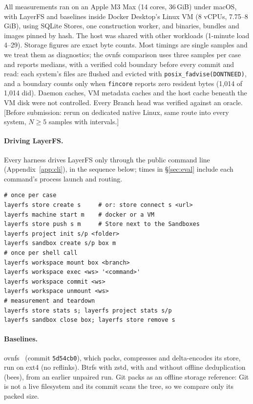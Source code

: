 \documentclass[letterpaper,twocolumn,10pt]{article}
\newif\ifdraft\drafttrue
\newcommand{\dnote}[1]{\ifdraft\textcolor{red!70!black}{\textsf{\small[#1]}}\fi}
\newcommand{\sys}{LayerFS}
\begin{document}
All measurements ran on an Apple M3 Max (14 cores, 36\,GiB) under macOS,
with \sys{} and baselines inside Docker Desktop's Linux VM (8 vCPUs,
7.75--8\,GiB), using SQLite Stores, one construction worker, and binaries,
bundles and images pinned by hash. The host was shared with other workloads
(1-minute load 4--29). Storage figures are exact byte counts. Most timings
are single samples and we treat them as diagnostics; the ovnfs comparison
uses three samples per case and reports medians, with a verified cold
boundary before every commit and read: each system's files are flushed and
evicted with \texttt{posix\_fadvise(DONTNEED)}, and a boundary counts only
when \texttt{fincore} reports zero resident bytes (1,014 of 1,014 did).
Daemon caches, VM metadata caches and the host cache beneath the VM disk
were not controlled. Every Branch head was verified against an oracle.
\dnote{Before submission: rerun on dedicated native Linux, same route into
every system, $N\geq5$ samples with intervals.}

\paragraph{Driving \sys{}.} Every harness drives \sys{} only through the
public command line (Appendix~\ref{app:cli}), in the sequence below; times
in \S\ref{sec:eval} include each command's process launch and routing.

{\footnotesize
\begin{verbatim}
# once per case
layerfs store create s     # or: store connect s <url>
layerfs machine start m    # docker or a VM
layerfs store push s m     # Store next to the Sandboxes
layerfs project init s/p <folder>
layerfs sandbox create s/p box m
# once per shell call
layerfs workspace mount box <branch>
layerfs workspace exec <ws> '<command>'
layerfs workspace commit <ws>
layerfs workspace unmount <ws>
# measurement and teardown
layerfs store stats s; layerfs project stats s/p
layerfs sandbox close box; layerfs store remove s
\end{verbatim}
}

\paragraph{Baselines.} ovnfs~\cite{ovnfs} (commit \texttt{5d54cb0}), which
packs, compresses and delta-encodes its store, run on ext4 (no reflinks).
Btrfs with zstd, with and without offline deduplication (bees), from an
earlier unpaired run. Git packs as an offline storage reference: Git is not
a live filesystem and its commit scans the tree, so we compare only its
packed size.
\end{document}
